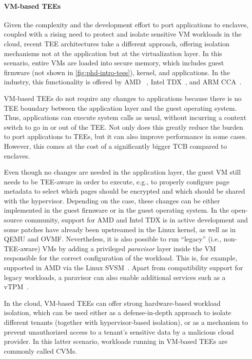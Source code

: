 \paragraph{VM-based TEEs}

Given the complexity and the development effort to port applications to
enclaves, coupled with a rising need to protect and isolate sensitive \ac{VM}
workloads in the cloud, recent \ac{TEE} architectures take a different approach,
offering isolation mechanisms not at the application but at the virtualization
layer. In this scenario, entire \acp{VM} are loaded into secure memory, which
includes guest firmware (not shown in \cref{fig:phd-intro-tees}), kernel, and
applications. In the industry, this functionality is offered by AMD
\sevsnp{}~\cite{AmdSevSnpWhitepaper}, Intel \ac{TDX}~\cite{intelTdxWhitepaper},
and ARM \ac{CCA}~\cite{armCCA}.

\acs{VM}-based \acp{TEE} do not require any changes to applications because
there is no \ac{TEE} boundary between the application layer and the guest
operating system. Thus, applications can execute system calls as usual, without
incurring a context switch to go in or out of the \ac{TEE}. Not only does this
greatly reduce the burden to port applications to \acp{TEE}, but it can also
improve performance in some cases. However, this comes at the cost of a
significantly bigger \ac{TCB} compared to enclaves.

Even though no changes are needed in the application layer, the guest \ac{VM}
still needs to be \ac{TEE}-aware in order to execute, e.g., to properly
configure page metadata to select which pages should be encrypted and which
should be shared with the hypervisor. Depending on the case, these changes can
be either implemented in the guest firmware or in the guest operating system. In
the open-source community, support for AMD \sevsnp{} and Intel \ac{TDX} is in
active development and some patches have already been upstreamed in the Linux
kernel, as well as in QEMU and \ac{OVMF}. Nevertheless, it is also possible to
run ``legacy'' (i.e., non-\ac{TEE}-aware) \acp{VM} by adding a privileged
\emph{paravisor} layer inside the \ac{VM} responsible for the correct
configuration of the workload. This is, for example, supported in AMD \sevsnp{}
via the Linux \ac{SVSM}~\cite{coconutSVSM}. Apart from compatibility support for
legacy workloads, a paravisor can also enable additional services such as a
\ac{vTPM}~\cite{narayanan2023svsm}.

In the cloud, \acs{VM}-based \acp{TEE} can offer strong hardware-based workload
isolation, which can be used either as a defense-in-depth approach to isolate
different tenants (together with hypervisor-based isolation), or as a mechanism
to prevent unauthorized access to a tenant's sensitive data by a malicious cloud
provider. In this latter scenario, workloads running in \acs{VM}-based \acp{TEE}
are commonly called \acp{CVM}.

